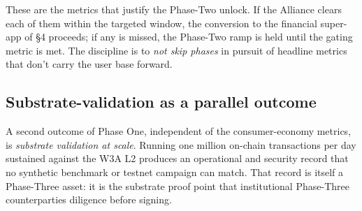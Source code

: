 These are the metrics that justify the Phase-Two unlock. If the Alliance
clears each of them within the targeted window, the conversion to the
financial super-app of \S 4 proceeds; if any is missed, the Phase-Two
ramp is held until the gating metric is met. The discipline is to
\emph{not skip phases} in pursuit of headline metrics that don't carry
the user base forward.

\subsection{Substrate-validation as a parallel outcome}

A second outcome of Phase One, independent of the consumer-economy
metrics, is \emph{substrate validation at scale}. Running one million
on-chain transactions per day sustained against the W3A L2 produces an
operational and security record that no synthetic benchmark or testnet
campaign can match. That record is itself a Phase-Three asset: it is the
substrate proof point that institutional Phase-Three counterparties
diligence before signing.
